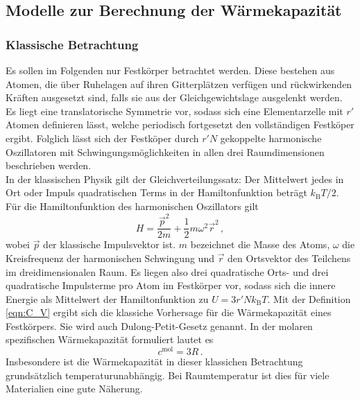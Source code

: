 \subsection{Modelle zur Berechnung der Wärmekapazität}
\label{subsec:modelleWaermekapazitaet}
\subsubsection{Klassische Betrachtung}
Es sollen im Folgenden nur Festkörper betrachtet werden. Diese bestehen aus Atomen, die über Ruhelagen auf ihren Gitterplätzen verfügen und rückwirkenden Kräften ausgesetzt sind, falls sie aus der Gleichgewichtslage ausgelenkt werden. Es liegt eine translatorische Symmetrie vor, sodass sich eine Elementarzelle mit $r'$ Atomen definieren lässt, welche periodisch fortgesetzt den vollständigen Festköper ergibt. Folglich lässt sich der Festköper durch $r'N$ gekoppelte harmonische Oszillatoren mit Schwingungsmöglichkeiten in allen drei Raumdimensionen beschrieben werden.\\
In der klassischen Physik gilt der Gleichverteilungssatz: Der Mittelwert jedes in Ort oder Impuls quadratischen Terms in der Hamiltonfunktion beträgt $k_\text{B} T / 2$. Für die Hamiltonfunktion des harmonischen Oszillators gilt
\begin{equation}
  H = \frac{\vec{p}^2}{2 m} + \frac{1}{2} m \omega^2 \vec{r}^2\,,
  \label{eqn:hamilton}
\end{equation}
wobei $\vec{p}$ der klassische Impulsvektor ist.
$m$ bezeichnet die Masse des Atoms, $\omega$ die Kreisfrequenz der harmonischen Schwingung und $\vec{r}$
den Ortsvektor des Teilchens im dreidimensionalen Raum. Es liegen also drei quadratische Orts- und drei quadratische Impulsterme pro Atom im Festkörper vor, sodass sich die innere Energie als Mittelwert der Hamiltonfunktion zu $U = 3 r' N k_\text{B} T$. Mit der Definition \eqref{eqn:C_V} ergibt sich die klassiche Vorhersage für die Wärmekapazität eines Festkörpers. Sie wird auch Dulong-Petit-Gesetz genannt. In der molaren spezifischen Wärmekapazität formuliert lautet es
\begin{equation}
  c^{\text{mol}} = 3 R\,.
  \label{eqn:dulongpetit}
\end{equation}
Insbesondere ist die Wärmekapazität in dieser klassichen Betrachtung grundsätzlich temperaturunabhängig. Bei Raumtemperatur ist dies für viele Materialien eine gute Näherung.

